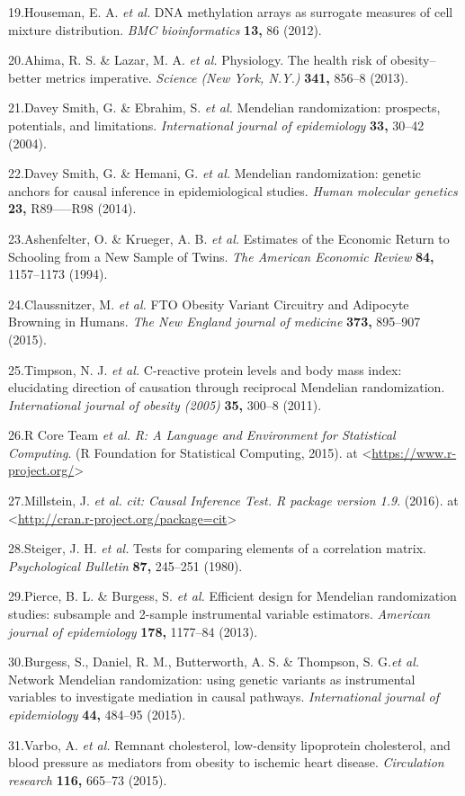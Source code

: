 \documentclass[]{article}
\begin{document}
19.Houseman, E. A. \emph{et al.} DNA methylation arrays as surrogate
measures of cell mixture distribution. \emph{BMC bioinformatics}
\textbf{13,} 86 (2012).

20.Ahima, R. S. \& Lazar, M. A. \emph{et al.} Physiology. The health
risk of obesity--better metrics imperative. \emph{Science (New York,
N.Y.)} \textbf{341,} 856--8 (2013).

21.{Davey Smith}, G. \& Ebrahim, S. \emph{et al.} Mendelian
randomization: prospects, potentials, and limitations.
\emph{International journal of epidemiology} \textbf{33,} 30--42 (2004).

22.{Davey Smith}, G. \& Hemani, G. \emph{et al.} Mendelian
randomization: genetic anchors for causal inference in epidemiological
studies. \emph{Human molecular genetics} \textbf{23,} R89-----R98
(2014).

23.Ashenfelter, O. \& Krueger, A. B. \emph{et al.} Estimates of the
Economic Return to Schooling from a New Sample of Twins. \emph{The
American Economic Review} \textbf{84,} 1157--1173 (1994).

24.Claussnitzer, M. \emph{et al.} FTO Obesity Variant Circuitry and
Adipocyte Browning in Humans. \emph{The New England journal of medicine}
\textbf{373,} 895--907 (2015).

25.Timpson, N. J. \emph{et al.} C-reactive protein levels and body mass
index: elucidating direction of causation through reciprocal Mendelian
randomization. \emph{International journal of obesity (2005)}
\textbf{35,} 300--8 (2011).

26.R Core Team \emph{et al.} \emph{R: A Language and Environment for
Statistical Computing}. (R Foundation for Statistical Computing, 2015).
at \textless{}\url{https://www.r-project.org/}\textgreater{}

27.Millstein, J. \emph{et al.} \emph{cit: Causal Inference Test. R
package version 1.9}. (2016). at
\textless{}\url{http://cran.r-project.org/package=cit}\textgreater{}

28.Steiger, J. H. \emph{et al.} Tests for comparing elements of a
correlation matrix. \emph{Psychological Bulletin} \textbf{87,} 245--251
(1980).

29.Pierce, B. L. \& Burgess, S. \emph{et al.} Efficient design for
Mendelian randomization studies: subsample and 2-sample instrumental
variable estimators. \emph{American journal of epidemiology}
\textbf{178,} 1177--84 (2013).

30.Burgess, S., Daniel, R. M., Butterworth, A. S. \& Thompson, S.
G.\emph{et al.} Network Mendelian randomization: using genetic variants
as instrumental variables to investigate mediation in causal pathways.
\emph{International journal of epidemiology} \textbf{44,} 484--95
(2015).

31.Varbo, A. \emph{et al.} Remnant cholesterol, low-density lipoprotein
cholesterol, and blood pressure as mediators from obesity to ischemic
heart disease. \emph{Circulation research} \textbf{116,} 665--73 (2015).
\end{document}
